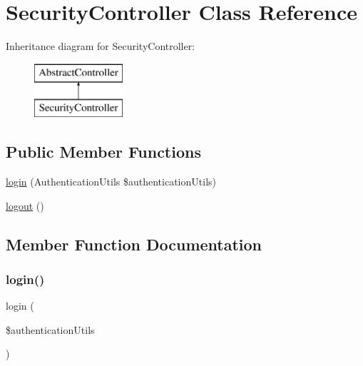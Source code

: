 \hypertarget{class_app_1_1_controller_1_1_security_controller}{}\section{Security\+Controller Class Reference}
\label{class_app_1_1_controller_1_1_security_controller}
Inheritance diagram for Security\+Controller\+:\begin{figure}[H]
\begin{center}
\leavevmode
\includegraphics[height=2.000000cm]{class_app_1_1_controller_1_1_security_controller}
\end{center}
\end{figure}
\subsection*{Public Member Functions}
\begin{DoxyCompactItemize}
\item 
\mbox{\hyperlink{class_app_1_1_controller_1_1_security_controller_a0c05ef8ddb2188649a9972a35f3c3512}{login}} (Authentication\+Utils \$authentication\+Utils)
\item 
\mbox{\hyperlink{class_app_1_1_controller_1_1_security_controller_a082405d89acd6835c3a7c7a08a7adbab}{logout}} ()
\end{DoxyCompactItemize}


\subsection{Member Function Documentation}
\mbox{\label{class_app_1_1_controller_1_1_security_controller_a0c05ef8ddb2188649a9972a35f3c3512}} 
\subsubsection{\texorpdfstring{login()}{login()}}
{\footnotesize\ttfamily login (\begin{DoxyParamCaption}\item[{Authentication\+Utils}]{\$authentication\+Utils }\end{DoxyParamCaption})}

